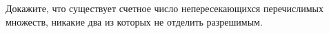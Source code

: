 Докажите, что существует счетное число непересекающихся перечислимых множеств, никакие два из которых не
отделить разрешимым.
